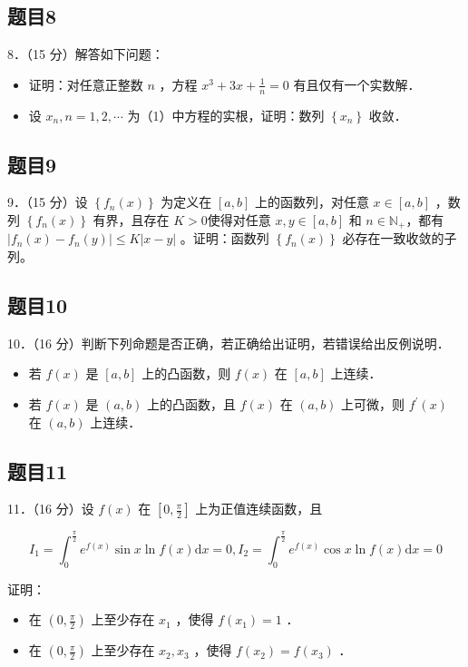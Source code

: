 \documentclass{article}
\begin{document}
\subsection{题目8}
8．（15 分）解答如下问题：

\begin{itemize}
  \item[（1）] 证明：对任意正整数 \(n\) ，方程 \(x^{3}+3 x+\frac{1}{n}=0\) 有且仅有一个实数解．
  \item[（2）] 设 \(x_{n}, n=1,2, \cdots\) 为（1）中方程的实根，证明：数列 \(\left\{x_{n}\right\}\) 收敛．
\end{itemize}

\subsection{题目9}
9．（15 分）设 \(\left\{f_{n}(x)\right\}\) 为定义在 \([a, b]\) 上的函数列，对任意 \(x \in[a, b]\) ，数列 \(\left\{f_{n}(x)\right\}\) 有界，且存在 \(K>0\)使得对任意 \(x, y \in[a, b]\) 和 \(n \in \mathbb{N}_{+}\)，都有 \(\left|f_{n}(x)-f_{n}(y)\right| \leq K|x-y|\) 。证明：函数列 \(\left\{f_{n}(x)\right\}\) 必存在一致收敛的子列。

\subsection{题目10}
10．（16 分）判断下列命题是否正确，若正确给出证明，若错误给出反例说明．

\begin{itemize}
  \item[（1）] 若 \(f(x)\) 是 \([a, b]\) 上的凸函数，则 \(f(x)\) 在 \([a, b]\) 上连续．
  \item[（2）] 若 \(f(x)\) 是 \((a, b)\) 上的凸函数，且 \(f(x)\) 在 \((a, b)\) 上可微，则 \(f^{\prime}(x)\) 在 \((a, b)\) 上连续．
\end{itemize}

\subsection{题目11}
11．（16 分）设 \(f(x)\) 在 \(\left[0, \frac{\pi}{2}\right]\) 上为正值连续函数，且

\[
I_{1}=\int_{0}^{\frac{\pi}{2}} e^{f(x)} \sin x \ln f(x) \mathrm{d} x=0, I_{2}=\int_{0}^{\frac{\pi}{2}} e^{f(x)} \cos x \ln f(x) \mathrm{d} x=0
\]

证明：

\begin{itemize}
  \item[（1）] 在 \(\left(0, \frac{\pi}{2}\right)\) 上至少存在 \(x_{1}\) ，使得 \(f\left(x_{1}\right)=1\) ．
  \item[（2）] 在 \(\left(0, \frac{\pi}{2}\right)\) 上至少存在 \(x_{2}, x_{3}\) ，使得 \(f\left(x_{2}\right)=f\left(x_{3}\right)\) ．
\end{itemize}
\end{document}
